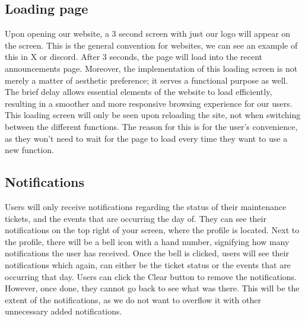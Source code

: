 \documentclass[conference]{IEEEtran}
\begin{document}
\subsection{Loading page}
Upon opening our website, a 3 second screen with just our logo will appear on the screen. This is the general convention for websites, we can see an example of this in X or discord. After 3 seconds, the page will load into the recent announcements page. Moreover, the implementation of this loading screen is not merely a matter of aesthetic preference; it serves a functional purpose as well. The brief delay allows essential elements of the website to load efficiently, resulting in a smoother and more responsive browsing experience for our users. This loading screen will only be seen upon reloading the site, not when switching between the different functions. The reason for this is for the user's convenience, as they won’t need to wait for the page to load every time they want to use a new function.
\subsection{Notifications}
Users will only receive notifications regarding the status of their maintenance tickets, and the events that are occurring the day of. They can see their notifications on the top right of your screen, where the profile is located. Next to the profile, there will be a bell icon with a hand number, signifying how many notifications the user has received. Once the bell is clicked, users will see their notifications which again, can either be the ticket status or the events that are occurring that day. Users can click the Clear button to remove the notifications. However, once done, they cannot go back to see what was there. This will be the extent of the notifications, as we do not want to overflow it with other unnecessary added notifications.
\end{document}
